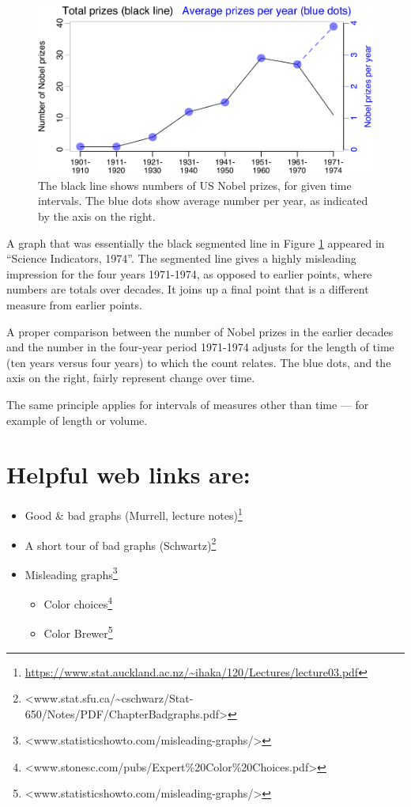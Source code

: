 \documentclass[
  10pt,
  b5paper]{book}
\providecommand{\tightlist}{%
  \setlength{\itemsep}{0pt}\setlength{\parskip}{0pt}}
\begin{document}
\begin{figure}[H]
\includegraphics[width=0.8\linewidth]{03-graphs_files/figure-latex/Nobel-1} \caption{The black line shows numbers of US Nobel prizes, for given time intervals.
The blue dots show average number per year, as indicated by the axis on the right.}\label{fig:Nobel}
\end{figure}

A graph that was essentially the black segmented line in Figure
\ref{fig:Nobel} appeared in
\citet{national1975science} ``Science Indicators, 1974''. The segmented line gives
a highly misleading impression for the four years 1971-1974, as
opposed to earlier points, where numbers are totals over decades.
It joins up a final point that is a different measure from earlier
points.

A proper comparison between the number of Nobel prizes
in the earlier decades and the number in the four-year
period 1971-1974 adjusts for the length of time (ten years
versus four years) to which the count relates. The blue
dots, and the axis on the right, fairly represent change
over time.

The same principle applies for intervals of measures
other than time --- for example of length or volume.

\enlargethispage{13pt}

\hypertarget{helpful-web-links-are}{%
\section{Helpful web links are:}\label{helpful-web-links-are}}

\begin{itemize}
\tightlist
\item
  Good \& bad graphs (Murrell, lecture notes)\footnote{\url{https://www.stat.auckland.ac.nz/~ihaka/120/Lectures/lecture03.pdf}}
\item
  A short tour of bad graphs (Schwartz)\footnote{\textless www.stat.sfu.ca/\textasciitilde cschwarz/Stat-650/Notes/PDF/ChapterBadgraphs.pdf\textgreater{}}
\item
  Misleading graphs\footnote{\textless www.statisticshowto.com/misleading-graphs/\textgreater{}}

  \begin{itemize}
  \tightlist
  \item
    Color choices\footnote{\textless www.stonesc.com/pubs/Expert\%20Color\%20Choices.pdf\textgreater{}}
  \item
    Color Brewer\footnote{\textless www.statisticshowto.com/misleading-graphs/\textgreater{}}
  \end{itemize}
\end{itemize}
\end{document}
